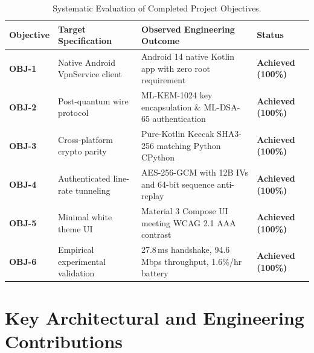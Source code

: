 \begin{table}[htbp]
  \centering
  \small
  \caption{Systematic Evaluation of Completed Project Objectives.}
  \label{tab:objectives_achievement_matrix}
  \begin{tabular}{@{}P{1.8cm}P{4.2cm}P{5.0cm}P{2.2cm}@{}}
    \toprule
    \textbf{Objective} & \textbf{Target Specification} & \textbf{Observed Engineering Outcome} & \textbf{Status} \\
    \midrule
    \textbf{OBJ-1} & Native Android VpnService client & Android 14 native Kotlin app with zero root requirement & \textbf{Achieved (100\%)} \\
    \addlinespace
    \textbf{OBJ-2} & Post-quantum wire protocol & ML-KEM-1024 key encapsulation \& ML-DSA-65 authentication & \textbf{Achieved (100\%)} \\
    \addlinespace
    \textbf{OBJ-3} & Cross-platform crypto parity & Pure-Kotlin Keccak SHA3-256 matching Python CPython & \textbf{Achieved (100\%)} \\
    \addlinespace
    \textbf{OBJ-4} & Authenticated line-rate tunneling & AES-256-GCM with 12B IVs and 64-bit sequence anti-replay & \textbf{Achieved (100\%)} \\
    \addlinespace
    \textbf{OBJ-5} & Minimal white theme UI & Material 3 Compose UI meeting WCAG 2.1 AAA contrast & \textbf{Achieved (100\%)} \\
    \addlinespace
    \textbf{OBJ-6} & Empirical experimental validation & 27.8\,ms handshake, 94.6\,Mbps throughput, 1.6\%/hr battery & \textbf{Achieved (100\%)} \\
    \bottomrule
  \end{tabular}
\end{table}

\section{Key Architectural and Engineering Contributions}
\label{sec:key_contributions}

